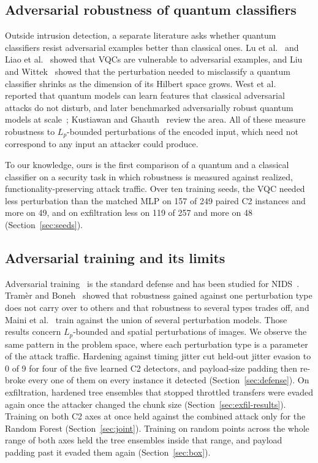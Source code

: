 \documentclass[preprint,12pt]{elsarticle}
\begin{document}
\subsection{Adversarial robustness of quantum classifiers}
Outside intrusion detection, a separate literature asks whether quantum classifiers resist
adversarial examples better than classical ones. Lu et al.~\cite{lu2020} and Liao et
al.~\cite{liao2021} showed that VQCs are vulnerable to adversarial examples, and Liu and
Wittek~\cite{liu2020} showed that the perturbation needed to misclassify a quantum classifier shrinks as
the dimension of its Hilbert space grows. West et
al.~\cite{west2023nature} reported that quantum models can learn features that classical adversarial
attacks do not disturb, and later benchmarked adversarially robust quantum models at
scale~\cite{west2023bench}; Kustiawan and Ghauth~\cite{qml_robust_review2026} review the area. All of
these measure robustness to $L_p$-bounded perturbations of the encoded input, which need not correspond
to any input an attacker could produce.

To our knowledge, ours is the first comparison of a quantum and a classical classifier on a security
task in which robustness is measured against realized, functionality-preserving attack traffic. Over ten
training seeds, the VQC needed less perturbation than the matched MLP on 157 of 249 paired C2 instances
and more on 49, and on exfiltration less on 119 of 257 and more on 48
(Section~\ref{sec:seeds}).

\subsection{Adversarial training and its limits}
Adversarial training~\cite{madry2018} is the standard defense and has been studied for
NIDS~\cite{apruzzese2020rf,ennaji2024,nids_advtrain2026}. Tram\`{e}r and Boneh~\cite{tramer2019} showed
that robustness gained against one perturbation type does not carry over to others and that robustness
to several types trades off, and Maini et al.~\cite{maini2020} train against the union of several
perturbation models. Those results concern $L_p$-bounded and spatial perturbations of images. We
observe the same pattern in the problem space, where each perturbation type is a parameter of the
attack traffic. Hardening against timing jitter cut
held-out jitter evasion to 0 of 9 for four of the five learned C2 detectors, and payload-size padding
then re-broke every one of them on every instance it detected (Section~\ref{sec:defense}). On
exfiltration, hardened tree ensembles that stopped throttled transfers were evaded again once the
attacker changed the chunk size (Section~\ref{sec:exfil-results}). Training on both C2 axes at once
held against the combined attack only for the Random Forest (Section~\ref{sec:joint}). Training on
random points across the whole range of both axes held the tree ensembles inside that range, and
payload padding past it evaded them again (Section~\ref{sec:box}).
\end{document}
